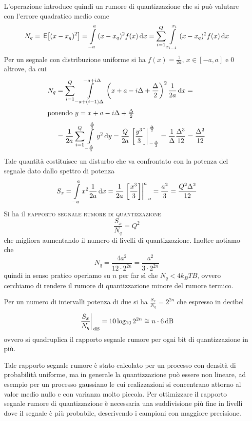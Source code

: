 L'operazione introduce quindi un rumore di quantizzazione che si può valutare con l'errore quadratico medio come
\[N_q=\E{(x-x_q)^2}=\intd{-a}{a}{(x-x_q)^2 f(x)}{x}=\sum_{i=1}^{Q}\intd{x_{i-1}}{x_i}{(x-x_q)^2 f(x)}{x}\]
Per un segnale con distribuzione uniforme si ha $f(x)=\frac{1}{2a},\,x\in[-a,a]$ e 0 altrove, da cui
\[\begin{split}N_q&=\sum_{i=1}^{Q}\intd{-a+(i-1)\Delta}{-a+i\Delta}{\left(x+a-i\Delta+\frac{\Delta}{2}\right)^2 \frac{1}{2a}}{x}=\\\intertext{ponendo $y=x+a-i\Delta+\frac{\Delta}{2}$}&=\frac{1}{2a}\sum_{i=1}^{Q}\intd{-\frac{\Delta}{2}}{\frac{\Delta}{2}}{y^2}{y}=\frac{Q}{2a}\bound{-\frac{\Delta}{2}}{\frac{\Delta}{2}}{\frac{y^3}{3}}=\frac{1}{\Delta}\frac{\Delta^3}{12}=\frac{\Delta^2}{12}
\end{split}\]
Tale quantità costituisce un disturbo che va confrontato con la potenza del segnale dato dallo spettro di potenza
\[S_x=\intd{-a}{a}{x^2\frac{1}{2a}}{x}=\frac{1}{2a}\bound{-a}{a}{\frac{x^3}{3}}=\frac{a^2}{3}=\frac{Q^2\Delta^2}{12}\]
Si ha il \textsc{rapporto segnale rumore di quantizzazione}
\begin{equation}
\frac{S_x}{N_q}=Q^2
\end{equation}
che migliora aumentando il numero di livelli di quantizzazione.
Inoltre notiamo che
\[N_q = \frac{4a^2}{12\cdot2^{2n}} = \frac{a^2}{3\cdot2^{2n}}\]
quindi in senso pratico operiamo su $n$ per far sì che $N_q < 4k_BTB$, ovvero
cerchiamo di rendere il rumore di quantizzazione minore del rumore termico.

Per un numero di intervalli potenza di due si ha $\frac{S_x}{N_q}=2^{2n}$ che espresso in decibel \[\restrict{\frac{S_x}{N_q}}{\text{dB}}=10\Log 2^{2n}\cong n\cdot\SI{6}{\decibel}\]
ovvero si quadruplica il rapporto segnale rumore per ogni bit di quantizzazione in più.

Tale rapporto segnale rumore è stato calcolato per un processo con densità di probabilità uniforme, ma in generale la quantizzazione può essere non lineare, ad esempio per un processo gaussiano le cui realizzazioni si concentrano attorno al valor medio nullo e con varianza molto piccola. Per ottimizzare il rapporto segnale rumore di quantizzazione è necessaria una suddivisione più fine in livelli dove il segnale è più probabile, descrivendo i campioni con maggiore precisione.

